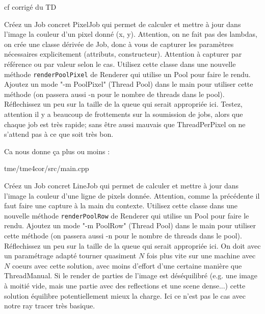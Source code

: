 \begin{prof}

cf corrigé du TD

\end{prof}

\question Créez un Job concret PixelJob qui permet de calculer et mettre à jour dans l'image la couleur d'un pixel donné (x, y).
Attention, on ne fait pas des lambdas, on crée une classe dérivée de Job, donc à vous de capturer les paramètres nécessaires explicitement
(attributs, constructeur). Attention à capturer par référence ou par valeur selon le cas.
Utilisez cette classe dans une nouvelle méthode \texttt{renderPoolPixel} de Renderer qui utilise un Pool pour faire le rendu.
Ajoutez un mode "-m PoolPixel" (Thread Pool) dans le main pour utiliser cette méthode (on passera aussi -n pour le nombre de threads dans le pool).
Réflechissez un peu sur la taille de la queue qui serait appropriée ici.
Testez, attention il y a beaucoup de frottements sur la soumission de jobs, alors que chaque job est très rapide; sans être aussi mauvais que ThreadPerPixel on ne s'attend pas 
à ce que soit très bon.


\begin{prof}

Ca nous donne ça plus ou moins :


\begin{lstinputlisting}[language=java,style=eclipse_file,title=\texttt{Queue.h}]
{tme/tme4cor/src/main.cpp}
\end{lstinputlisting}

\end{prof}


\question Créez un Job concret LineJob qui permet de calculer et mettre à jour dans l'image la couleur d'une ligne de pixels donnée.
Attention, comme la précédente il faut faire une capture à la main du contexte.
Utilisez cette classe dans une nouvelle méthode \texttt{renderPoolRow} de Renderer qui utilise un Pool pour faire le rendu.
Ajoutez un mode "-m PoolRow" (Thread Pool) dans le main pour utiliser cette méthode (on passera aussi -n pour le nombre de threads dans le pool).
Réflechissez un peu sur la taille de la queue qui serait appropriée ici.
On doit avec un paramétrage adapté tourner quasiment $N$ fois plus vite sur une machine avec $N$ coeurs avec cette solution,
avec moins d'effort d'une certaine manière que ThreadManual. Si le render de parties de l'image est déséquilibré 
(e.g. une image à moitié vide, mais une partie avec des reflections et une scene dense...) cette solution
 équilibre potentiellement mieux la charge. Ici ce n'est pas le cas avec notre ray tracer très basique.


